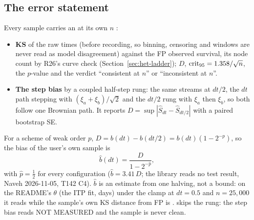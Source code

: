 \subsection{The error statement}\label{sec:lgv-error}

Every sample carries an  at its own $n$ :
\begin{itemize}[nosep]
  \item \textbf{KS} of the raw times (before recording, so binning, censoring and windows are never read as model
    disagreement) against the FP observed survival, its node count by R26's curve check
    (Section~\ref{sec:het-ladder}); $D$, ${\rm crit}_{95}=1.358/\sqrt n$, the $p$-value and the verdict
    ``consistent at $n$'' or ``inconsistent at $n$''.
  \item \textbf{The step bias} by a coupled half-step rung: the same streams at $dt/2$, the $dt$ path stepping with
    $(\xi_a+\xi_b)/\sqrt2$ and the $dt/2$ rung with $\xi_a$ then $\xi_b$, so both follow one Brownian path. It reports
    $D=\sup|\hat S_{dt}-\hat S_{dt/2}|$ with a paired bootstrap SE.
\end{itemize}
For a scheme of weak order $p$, $D=b(dt)-b(dt/2)=b(dt)(1-2^{-p})$, so the bias of the user's own sample is
\begin{equation}\label{eq:lgv-bdt}
  \hat b(dt)=\frac{D}{1-2^{-\hat p}},
\end{equation}
with $\hat p=\frac12$ for every configuration ($\hat b=3.41\,D$; the library reads no test result, Naveh
2026-11-05, T142 C4). $\hat b$ is an
estimate from one halving, not a bound: on the README's $\theta$ (the ITP fit, days) under the clamp at $dt=0.5$ and
$n=25{,}000$ it reads
 while the sample's own KS distance
from FP is .  skips the rung:
the step bias reads NOT MEASURED and the sample is never clean.

